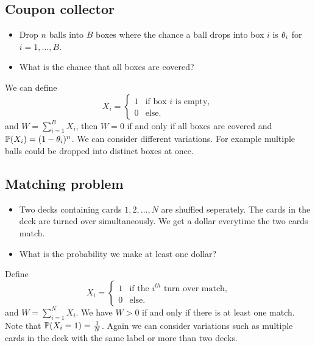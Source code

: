 \subsection{Coupon collector}
\begin{itemize}
    \item Drop $n$ balls into $B$ boxes where the chance a ball drops into box $i$ is ${\theta}_i$ for $i =1,\ldots, B$.
    \item What is the chance that all boxes are covered?
\end{itemize}
We can define 
\[X_i = \begin{cases}
    1 & \text{if box $i$ is empty},\\
    0 & \text{else}.
\end{cases} \]
and $W = \sum_{i=1}^B X_i$, then $W=0$ if and only if all boxes are covered and ${\mathbb{P}}(X_i) = (1-{\theta}_i)^n$. We can consider different variations. For example multiple balls could be dropped into distinct boxes at once.
\subsection{Matching problem}
\begin{itemize}
    \item Two decks containing cards $1,2,\ldots,N$ are shuffled seperately. The cards in the deck are turned over simultaneously. We get a dollar everytime the two cards match.
    \item What is the probability we make at least one dollar?
\end{itemize}
Define 
\[X_i = \begin{cases}
    1 & \text{if the $i^{th}$ turn over match,}\\
    0 &  \text{else.}
\end{cases} \]
and $W = \sum_{i=1}^N X_i$. We have $W > 0$ if and only if there is at least one match. Note that ${\mathbb{P}}(X_i=1)= \frac{1}{N}$. Again we can consider variations such as multiple cards in the deck with the same label or more than two decks.
